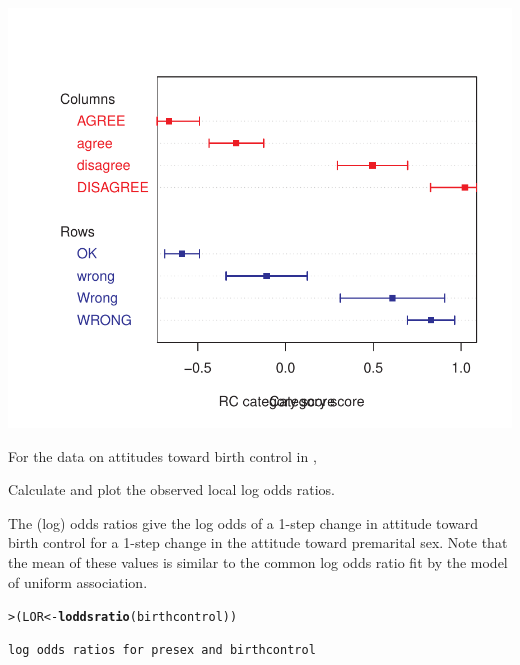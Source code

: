 \documentclass[10pt]{report}\usepackage[]{graphicx}\usepackage[]{color}
\makeatletter
\newcommand{\hlstd}[1]{\textcolor[rgb]{0.345,0.345,0.345}{#1}}%
\newcommand{\hlkwb}[1]{\textcolor[rgb]{0.69,0.353,0.396}{#1}}%
\newcommand{\hlkwd}[1]{\textcolor[rgb]{0.737,0.353,0.396}{\textbf{#1}}}%
\newenvironment{kframe}{%
 \def\at@end@of@kframe{}%
 \ifinner\ifhmode%
  \def\at@end@of@kframe{\end{minipage}}%
  \begin{minipage}{\columnwidth}%
 \fi\fi%
 \def\FrameCommand##1{\hskip\@totalleftmargin \hskip-\fboxsep
 \colorbox{shadecolor}{##1}\hskip-\fboxsep
     \hskip-\linewidth \hskip-\@totalleftmargin \hskip\columnwidth}%
 \MakeFramed {\advance\hsize-\width
   \@totalleftmargin\z@ \linewidth\hsize
   \@setminipage}}%
 {\par\unskip\endMakeFramed%
 \at@end@of@kframe}
\newenvironment{knitrout}{}{} %
\renewenvironment{knitrout}{\small\renewcommand{\baselinestretch}{.85}}{} %
\makeatother
\begin{document}
\begin{Exercises}
\begin{enumerate*}
\begin{ans}
\begin{knitrout}
\centerline{\includegraphics[width=.5\textwidth]{soln/fig/ex10_2e2-1} }



\end{knitrout}

    \end{ans}
    
  \end{enumerate*}
  
  \exercise For the data on attitudes toward birth control in ,
  \begin{enumerate*}
    \item Calculate and plot the observed local log odds ratios.
    \begin{ans}
    The (log) odds ratios give the log odds of a 1-step change in attitude
    toward birth control for a 1-step change in the attitude toward premarital sex.
    Note that the mean of these values is similar to the common log odds
    ratio fit by the model of uniform association.
\begin{knitrout}\footnotesize
{}\color{fgcolor}\begin{kframe}
\begin{alltt}
\hlstd{> }\hlstd{(LOR} \hlkwb{<-} \hlkwd{loddsratio}\hlstd{(birthcontrol))}
\end{alltt}
\begin{verbatim}
log odds ratios for presex and birthcontrol 


\end{verbatim}
\end{kframe}
\end{knitrout}
\end{ans}
\end{enumerate*}
\end{Exercises}
\end{document}
